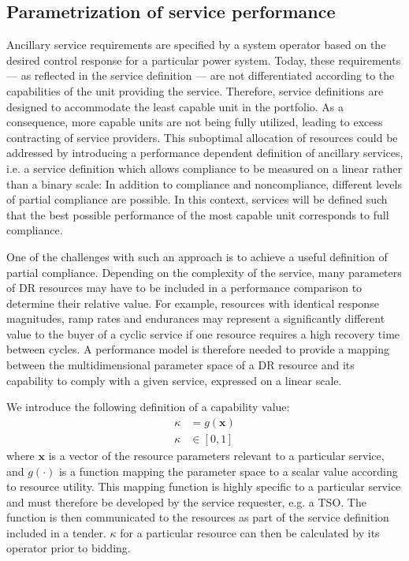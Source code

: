 \subsection{Parametrization of service performance}\label{subsec:parametrization}
Ancillary service requirements are specified by a system operator based on the desired control response for a particular power system. Today, these requirements --- as reflected in the service definition --- are not differentiated according to the capabilities of the unit providing the service. Therefore, service definitions are designed to accommodate the least capable unit in the portfolio. As a consequence, more capable units are not being fully utilized, leading to excess contracting of service providers.
This suboptimal allocation of resources could be addressed by introducing a performance dependent definition of ancillary services, i.e. a service definition which allows compliance to be measured on a linear rather than a binary scale: In addition to compliance and noncompliance, different levels of partial compliance are possible.
In this context, services will be defined such that the best possible performance of the most capable unit corresponds to full compliance.

One of the challenges with such an approach is to achieve a useful definition of partial compliance. Depending on the complexity of the service, many parameters of DR resources may have to be included in a performance comparison to determine their relative value. For example, resources with identical response magnitudes, ramp rates and endurances may represent a significantly different value to the buyer of a cyclic service if one resource requires a high recovery time between cycles. A performance model is therefore needed to provide a mapping between the multidimensional parameter space of a DR resource and its capability to comply with a given service, expressed on a linear scale. 

We introduce the following definition of a capability value:
\begin{align}
    \kappa &= g(\mathbf{x}) \\
    \kappa &\in [0,1]
\end{align}
where $\mathbf{x}$ is a vector of the resource parameters relevant to a particular service, and $g(\cdot)$ is a function mapping the parameter space to a scalar value according to resource utility. This mapping function is highly specific to a particular service and must therefore be developed by the service requester, e.g. a TSO. The function is then communicated to the resources as part of the service definition included in a tender. $\kappa$ for a particular resource can then be calculated by its operator prior to bidding.

